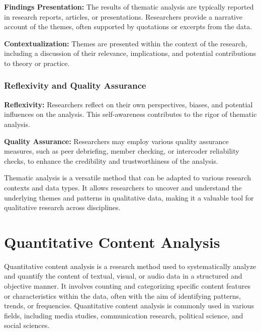 \documentclass[
  b5paper]{book}
\begin{document}
\textbf{Findings Presentation:} The results of thematic analysis are typically reported in research reports, articles, or presentations. Researchers provide a narrative account of the themes, often supported by quotations or excerpts from the data.

\textbf{Contextualization:} Themes are presented within the context of the research, including a discussion of their relevance, implications, and potential contributions to theory or practice.

\hypertarget{reflexivity-and-quality-assurance}{%
\subsection*{\texorpdfstring{\textbf{Reflexivity and Quality Assurance}}{Reflexivity and Quality Assurance}}\label{reflexivity-and-quality-assurance}}

\textbf{Reflexivity:} Researchers reflect on their own perspectives, biases, and potential influences on the analysis. This self-awareness contributes to the rigor of thematic analysis.

\textbf{Quality Assurance:} Researchers may employ various quality assurance measures, such as peer debriefing, member checking, or intercoder reliability checks, to enhance the credibility and trustworthiness of the analysis.

Thematic analysis is a versatile method that can be adapted to various research contexts and data types. It allows researchers to uncover and understand the underlying themes and patterns in qualitative data, making it a valuable tool for qualitative research across disciplines.

\hypertarget{quantitative-content-analysis-1}{%
\chapter{Quantitative Content Analysis}\label{quantitative-content-analysis-1}}

Quantitative content analysis is a research method used to systematically analyze and quantify the content of textual, visual, or audio data in a structured and objective manner. It involves counting and categorizing specific content features or characteristics within the data, often with the aim of identifying patterns, trends, or frequencies. Quantitative content analysis is commonly used in various fields, including media studies, communication research, political science, and social sciences.
\end{document}
